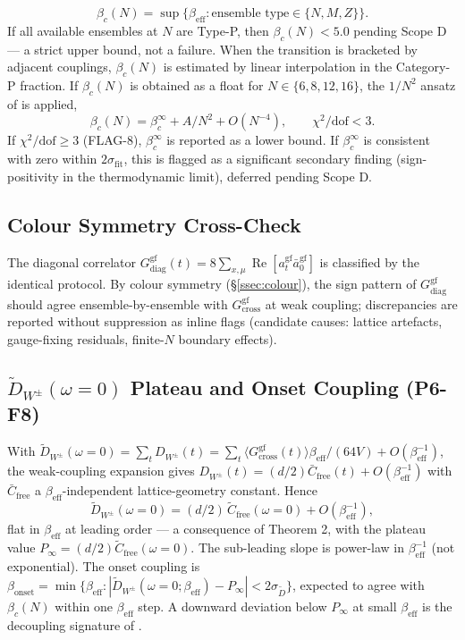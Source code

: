 \documentclass[11pt,a4paper]{article}
\theoremstyle{plain}
\theoremstyle{definition}
\theoremstyle{remark}
\renewcommand{\Re}{\operatorname{Re}}
\newcommand{\Gcrossgf}{G_{\mathrm{cross}}^{\mathrm{gf}}}
\newcommand{\Gdiaggf}{G_{\mathrm{diag}}^{\mathrm{gf}}}
\newcommand{\DW}{D_{W^{\pm}}}
\newcommand{\DWt}{\widetilde{D}_{W^{\pm}}}
\newcommand{\be}{\beta_{\mathrm{eff}}}
\newcommand{\bc}{\beta_{c}}
\begin{document}
\begin{equation}
  \bc(N)=\sup\{\be:\text{ensemble type}\in\{N,M,Z\}\}.
  \label{eq:betacdef}
\end{equation}
If all available ensembles at $N$ are Type-P, then $\bc(N)<5.0$ pending
Scope D --- a strict upper bound, not a failure. When the transition is
bracketed by adjacent couplings, $\bc(N)$ is estimated by linear
interpolation in the Category-P fraction. If $\bc(N)$ is obtained as a
float for $N\in\{6,8,12,16\}$, the $1/N^2$ ansatz of
 is applied,
\begin{equation}
  \bc(N)=\bc^{\infty}+A/N^2+O(N^{-4}),\qquad\chi^2/\mathrm{dof}<3.
  \label{eq:betacfit}
\end{equation}
If $\chi^2/\mathrm{dof}\ge3$ (FLAG-8), $\bc^{\infty}$ is reported as a
lower bound. If $\bc^{\infty}$ is consistent with zero within
$2\sigma_{\mathrm{fit}}$, this is flagged as a significant secondary
finding (sign-positivity in the thermodynamic limit), deferred pending
Scope D.

\subsection{Colour Symmetry Cross-Check}
\label{ssec:colourcrosscheck}

The diagonal correlator
$\Gdiaggf(t)=8\sum_{x,\mu}\Re[a^{\mathrm{gf}}_t\bar a^{\mathrm{gf}}_0]$
is classified by the identical protocol. By colour symmetry
(\S\ref{ssec:colour}), the sign pattern of $\Gdiaggf$ should agree
ensemble-by-ensemble with $\Gcrossgf$ at weak coupling; discrepancies are
reported without suppression as inline flags (candidate causes: lattice
artefacts, gauge-fixing residuals, finite-$N$ boundary effects).

\subsection{$\DWt(\omega{=}0)$ Plateau and Onset Coupling (P6-F8)}
\label{ssec:plateau}

With $\DWt(\omega{=}0)=\sum_t\DW(t)
=\sum_t\langle\Gcrossgf(t)\rangle\be/(64V)+O(\be^{-1})$, the
weak-coupling expansion gives $\DW(t)=(d/2)\bar C_{\mathrm{free}}(t)
+O(\be^{-1})$ with $\bar C_{\mathrm{free}}$ a $\be$-independent
lattice-geometry constant. Hence
\begin{equation}
  \DWt(\omega{=}0)=(d/2)\,\widetilde C_{\mathrm{free}}(\omega{=}0)
  +O(\be^{-1}),
  \label{eq:plateauval}
\end{equation}
flat in $\be$ at leading order --- a consequence of Theorem 2, with the
plateau value $P_\infty=(d/2)\widetilde C_{\mathrm{free}}(\omega{=}0)$.
The sub-leading slope is power-law in $\be^{-1}$ (not exponential). The
onset coupling is $\beta_{\mathrm{onset}}=\min\{\be:|\DWt(\omega{=}0;\be)
-P_\infty|<2\sigma_{\widetilde D}\}$, expected to agree with $\bc(N)$
within one $\be$ step. A downward deviation below $P_\infty$ at small
$\be$ is the decoupling signature of \cite{CM,Bo}.
\end{document}
